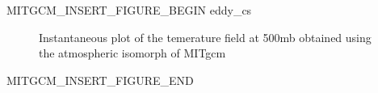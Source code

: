 \begin{rawhtml}MITGCM_INSERT_FIGURE_BEGIN eddy_cs\end{rawhtml}
\begin{figure}
\caption{Instantaneous plot of the temerature field at 500mb 
obtained using the atmospheric isomorph of MITgcm}
\label{fig:eddy_cs}
\end{figure}
\begin{rawhtml}MITGCM_INSERT_FIGURE_END\end{rawhtml}
